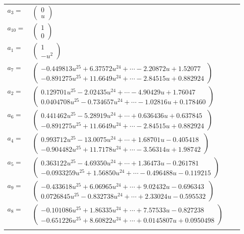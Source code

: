 \documentclass[1p]{elsarticle_modified}
\theoremstyle{definition}
\begin{document}
\begin{tabular}{m{7pt} m{180pt} m{7pt} m{180pt} }
\flushright $a_{3}=$&$\begin{pmatrix}0\\u\end{pmatrix}$ \\
\flushright $a_{10}=$&$\begin{pmatrix}1\\0\end{pmatrix}$ \\
\flushright $a_{1}=$&$\begin{pmatrix}1\\- u^2\end{pmatrix}$ \\
\flushright $a_{7}=$&$\begin{pmatrix}-0.449813 u^{25}+6.37572 u^{24}+\cdots-2.20872 u+1.52077\\-0.891275 u^{25}+11.6649 u^{24}+\cdots-2.84515 u+0.882924\end{pmatrix}$ \\
\flushright $a_{2}=$&$\begin{pmatrix}0.129701 u^{25}-2.02435 u^{24}+\cdots-4.90429 u+1.76047\\0.0404708 u^{25}-0.734657 u^{24}+\cdots-1.02816 u+0.178460\end{pmatrix}$ \\
\flushright $a_{6}=$&$\begin{pmatrix}0.441462 u^{25}-5.28919 u^{24}+\cdots+0.636436 u+0.637845\\-0.891275 u^{25}+11.6649 u^{24}+\cdots-2.84515 u+0.882924\end{pmatrix}$ \\
\flushright $a_{4}=$&$\begin{pmatrix}0.993712 u^{25}-13.0075 u^{24}+\cdots+1.68701 u-0.405418\\-0.904482 u^{25}+11.7178 u^{24}+\cdots-3.56314 u+1.98742\end{pmatrix}$ \\
\flushright $a_{5}=$&$\begin{pmatrix}0.363122 u^{25}-4.69350 u^{24}+\cdots+1.36473 u-0.261781\\-0.0933259 u^{25}+1.56850 u^{24}+\cdots-0.496488 u-0.119215\end{pmatrix}$ \\
\flushright $a_{9}=$&$\begin{pmatrix}-0.433618 u^{25}+6.06965 u^{24}+\cdots+9.02432 u-0.696343\\0.0726845 u^{25}-0.832738 u^{24}+\cdots+2.33024 u-0.595532\end{pmatrix}$ \\
\flushright $a_{8}=$&$\begin{pmatrix}-0.101086 u^{25}+1.86335 u^{24}+\cdots+7.57533 u-0.827238\\-0.651226 u^{25}+8.60822 u^{24}+\cdots+0.0145807 u+0.0950498\end{pmatrix}$\\&\end{tabular}
\end{document}
